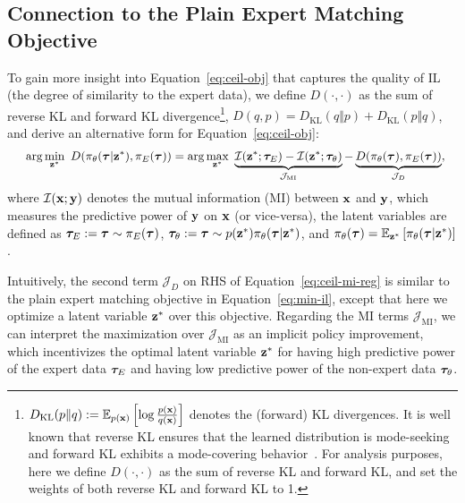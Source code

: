 \subsection{Connection to the Plain Expert Matching Objective}
\label{sec:mutual-info-reg}

To gain more insight into Equation~\ref{eq:ceil-obj} that captures the quality of IL (the degree of similarity to the expert data), we define $D(\cdot, \cdot)$ as the sum of reverse KL and forward KL divergence\footnote{$D_\text{KL}(p\Vert q):=\mathbb{E}_{p(\mathbf{x})}\left[ \log \frac{p(\mathbf{x})}{q(\mathbf{x})} \right]$ denotes the (forward) KL divergences. It is well known that reverse KL ensures that the learned distribution is mode-seeking and forward KL exhibits a mode-covering behavior~\citep{ke2020imitation}. For analysis purposes, here we define $D(\cdot, \cdot)$ as the sum of reverse KL and forward KL, and set the weights of both reverse KL and forward KL to 1.}, \ie $D(q, p) = D_\text{KL}(q\Vert p) + D_\text{KL}(p\Vert q)$, and derive an alternative form for Equation~\ref{eq:ceil-obj}: 
\begin{align}
	&\ \quad \arg \min_{{\mathbf{z}}^*} \ D(\pi_\theta({\bm{\tau}}|{\mathbf{z}}^*), \pi_E({\bm{\tau}})) 
	= \arg \max_{{\mathbf{z}}^*} \ \underbrace{\mathcal{I}({\mathbf{z}}^*; {\bm{\tau}}_E) - \mathcal{I}({\mathbf{z}}^*; {\bm{\tau}}_\theta)}_{\mathcal{J}_\text{MI}}
	- \underbrace{D(\pi_\theta({\bm{\tau}}), \pi_E({\bm{\tau}}))}_{\mathcal{J}_{D}}, \label{eq:ceil-mi-reg}
\end{align}
where $\mathcal{I}(\mathbf{x};\mathbf{y})$ denotes the mutual information (MI) between $\mathbf{x}$ and $\mathbf{y}$, which measures the predictive power of $\mathbf{y}$ on $\mathbf{x}$ (or vice-versa), 
the latent variables are defined as ${\bm{\tau}}_E:={\bm{\tau}} \sim \pi_E({\bm{\tau}})$, ${\bm{\tau}}_\theta:={\bm{\tau}} \sim p({\mathbf{z}}^*)\pi_\theta({\bm{\tau}}|{\mathbf{z}}^*)$, and $\pi_\theta({\bm{\tau}})=\mathbb{E}_{{\mathbf{z}}^*}\left[ \pi_\theta({\bm{\tau}}|{\mathbf{z}}^*) \right]$. 

Intuitively, the second term $\mathcal{J}_{D}$ on RHS of Equation~\ref{eq:ceil-mi-reg} is similar to the plain expert matching objective in Equation~\ref{eq:min-il}, except that here we optimize a latent variable ${\mathbf{z}}^*$ over this objective. Regarding the MI terms $\mathcal{J}_\text{MI}$, we can interpret the maximization over $\mathcal{J}_\text{MI}$ as an implicit policy improvement, which incentivizes the optimal latent variable ${\mathbf{z}}^*$ for having high predictive power of the expert data ${\bm{\tau}}_E$ and having low predictive power of the non-expert data ${\bm{\tau}}_\theta$. 

